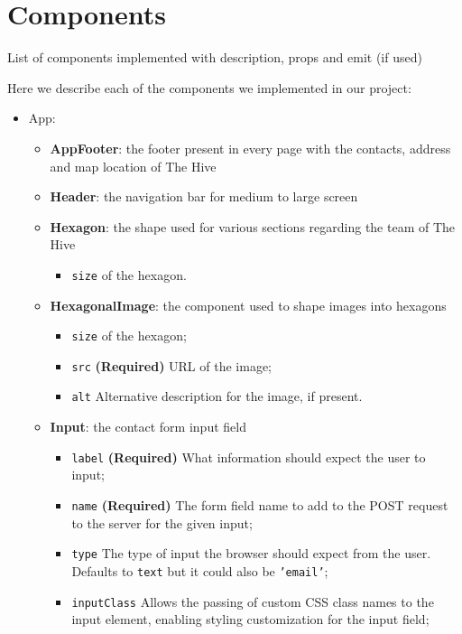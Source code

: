 \section{Components}
List of components implemented with description, props and emit (if used)

Here we describe each of the components we implemented in our project:
\begin{itemize}
    \item App:
    \begin{itemize}
        \item \textbf{AppFooter}: the footer present in every page with the contacts, address and map location of The Hive
        \item \textbf{Header}: the navigation bar for medium to large screen
        \item \textbf{Hexagon}: the shape used for various sections regarding the team of The Hive
        \begin{itemize}
            \item \texttt{size} of the hexagon.
        \end{itemize}
        \item \textbf{HexagonalImage}: the component used to shape images into hexagons
        \begin{itemize}
            \item \texttt{size} of the hexagon;
            \item \texttt{src} \textbf{(Required)} URL of the image;
            \item \texttt{alt} Alternative description for the image, if present.
        \end{itemize}
        \item \textbf{Input}: the contact form input field
        \begin{itemize}
            \item \texttt{label} \textbf{(Required)} What information should expect the user to input;
            \item \texttt{name} \textbf{(Required)} The form field name to add to the POST request to the server for the given input;
            \item \texttt{type} The type of input the browser should expect from the user. Defaults to \texttt{text} but it could also be \texttt{'email'};
            \item \texttt{inputClass} Allows the passing of custom CSS class names to the input element, enabling styling customization for the input field;

\end{itemize}
\end{itemize}
\end{itemize}
